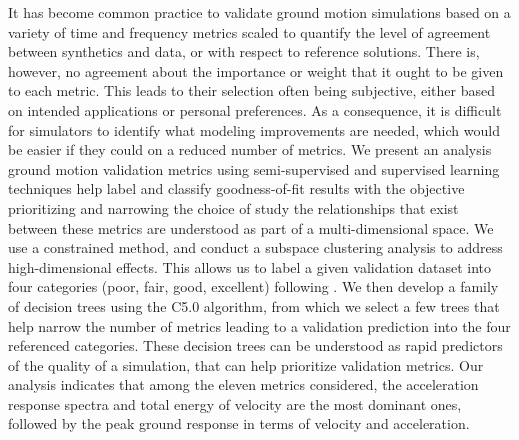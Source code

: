 % 
It has become common practice to validate ground motion simulations based on a variety of time and frequency metrics scaled to quantify the level of agreement between synthetics and data, or with respect to reference solutions. There is, however, no agreement about the importance or weight that it ought to be given to each metric. This leads to their selection often being subjective, either based on intended applications or personal preferences. As a consequence, it is difficult for simulators to identify what modeling improvements are needed, which would be easier if they could  on a reduced number of metrics. We present an analysis  ground motion validation metrics using semi-supervised and supervised learning techniques help label and classify goodness-of-fit results with the objective  prioritizing and narrowing the choice of  study the relationships that exist between  these metrics are understood as part of a multi-dimensional space. We use a constrained \kmeans{} method, and conduct a subspace clustering analysis to address high-dimensional effects. This allows us to label a given validation dataset into four categories (poor, fair, good, excellent) following . We then develop a family of decision trees using the C5.0 algorithm, from which we select a few trees that help narrow the number of metrics leading to a validation prediction into the four referenced categories. These decision trees can be understood as rapid predictors of the quality of a simulation,  that can help prioritize validation metrics. Our analysis indicates that among the eleven metrics considered, the acceleration response spectra and total energy of velocity are the most dominant ones, followed by the peak ground response in terms of velocity and acceleration.
